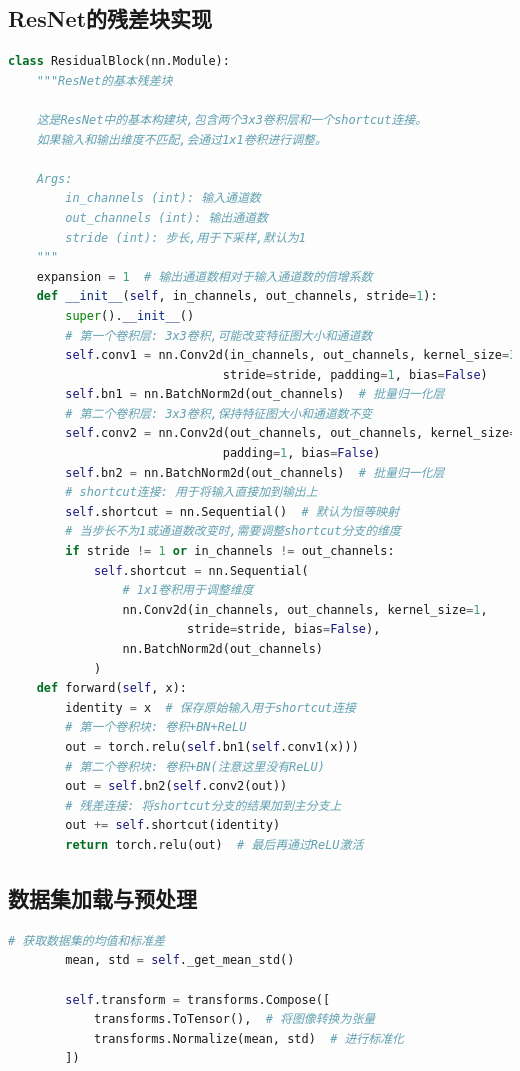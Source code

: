 \documentclass[UTF8]{ctexart}
\begin{document}
\subsection{ResNet的残差块实现}
\begin{lstlisting}[language=Python]
class ResidualBlock(nn.Module):
    """ResNet的基本残差块
    
    这是ResNet中的基本构建块,包含两个3x3卷积层和一个shortcut连接。
    如果输入和输出维度不匹配,会通过1x1卷积进行调整。
    
    Args:
        in_channels (int): 输入通道数
        out_channels (int): 输出通道数 
        stride (int): 步长,用于下采样,默认为1
    """
    expansion = 1  # 输出通道数相对于输入通道数的倍增系数
    def __init__(self, in_channels, out_channels, stride=1):
        super().__init__()
        # 第一个卷积层: 3x3卷积,可能改变特征图大小和通道数
        self.conv1 = nn.Conv2d(in_channels, out_channels, kernel_size=3, 
                              stride=stride, padding=1, bias=False)
        self.bn1 = nn.BatchNorm2d(out_channels)  # 批量归一化层
        # 第二个卷积层: 3x3卷积,保持特征图大小和通道数不变
        self.conv2 = nn.Conv2d(out_channels, out_channels, kernel_size=3,
                              padding=1, bias=False)
        self.bn2 = nn.BatchNorm2d(out_channels)  # 批量归一化层
        # shortcut连接: 用于将输入直接加到输出上
        self.shortcut = nn.Sequential()  # 默认为恒等映射
        # 当步长不为1或通道数改变时,需要调整shortcut分支的维度
        if stride != 1 or in_channels != out_channels:
            self.shortcut = nn.Sequential(
                # 1x1卷积用于调整维度
                nn.Conv2d(in_channels, out_channels, kernel_size=1,
                         stride=stride, bias=False),
                nn.BatchNorm2d(out_channels)
            )
    def forward(self, x):
        identity = x  # 保存原始输入用于shortcut连接
        # 第一个卷积块: 卷积+BN+ReLU
        out = torch.relu(self.bn1(self.conv1(x)))
        # 第二个卷积块: 卷积+BN(注意这里没有ReLU)
        out = self.bn2(self.conv2(out))
        # 残差连接: 将shortcut分支的结果加到主分支上
        out += self.shortcut(identity)
        return torch.relu(out)  # 最后再通过ReLU激活
\end{lstlisting}

\subsection{数据集加载与预处理}
\begin{lstlisting}[language=Python]
        # 获取数据集的均值和标准差
        mean, std = self._get_mean_std()

        self.transform = transforms.Compose([
            transforms.ToTensor(),  # 将图像转换为张量
            transforms.Normalize(mean, std)  # 进行标准化
        ])
\end{lstlisting}
\end{document}
